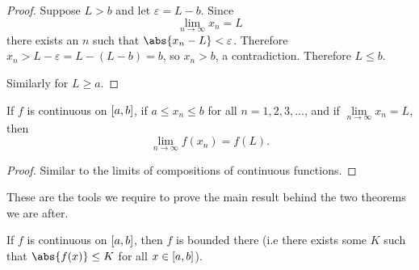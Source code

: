 \begin{proof}
	Suppose $L > b$ and let $\varepsilon = L - b$.
	Since
	\[
		\lim_{n \to \infty} x_n = L
	\]
	there exists an $n$ such that $\abs{x_n - L} < \varepsilon$.
	Therefore $x_n > L - \varepsilon = L - (L - b) = b$, so $x_n > b$, a contradiction.
	Therefore $L \leq b$.

	Similarly for $L \geq a$.
\end{proof}

\begin{theorem}\label{lec8:seqlim}
	If $f$ is continuous on $\interval{a}{b}$, if $a \leq x_n \leq b$ for all $n = 1, 2, 3, \ldots$, and if $\lim\limits_{n \to \infty} x_n = L$, then
	\[
		\lim_{n \to \infty} f(x_n) = f(L).
	\]
\end{theorem}

\begin{proof}
	Similar to the limits of compositions of continuous functions.
\end{proof}

\noindent
These are the tools we require to prove the main result behind the two theorems we are after.

\begin{theorem}
	If $f$ is continuous on $\interval{a}{b}$, then $f$ is bounded there (i.e there exists some $K$ such that $\abs{f(x)} \leq K$ for all $x \in \interval{a}{b}$).
\end{theorem}

